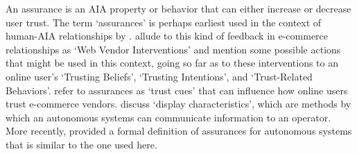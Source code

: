 

    An assurance is an AIA property or behavior that can either increase or decrease user trust. %
    The term `assurances' is perhaps earliest used in the context of human-AIA relationships by \citet{Sheridan1984-kx}. \citet{McKnight2001-fa} allude to this kind of feedback in e-commerce relationships as `Web Vendor Interventions' and mention some possible actions that might be used in this context, going so far as to these interventions to an online user's `Trusting Beliefs', `Trusting Intentions', and `Trust-Related Behaviors'. %
    \citet{Corritore2003-gx} refer to assurances as `trust cues' that can influence how online users trust e-commerce vendors. \citet{Lee2004-pv} discuss `display characteristics', which are methods by which an autonomous systems can communicate information to an operator. More recently, \citet{Lillard2016-yg} provided a formal definition of assurances for autonomous systems that is similar to the one used here. %

